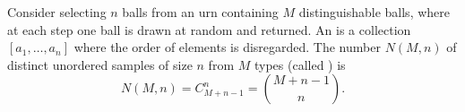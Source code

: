 Consider selecting $n$ balls from an urn containing $M$ distinguishable balls, where at each step one ball is drawn at random and returned. An  is a collection $[a_1, \ldots, a_n]$ where the order of elements is disregarded. The number $N(M,n)$ of distinct unordered samples of size $n$ from $M$ types (called ) is
$$N(M,n) = C_{M+n-1}^{n} = \binom{M+n-1}{n}.$$
